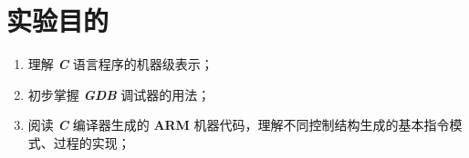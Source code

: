 \section{实验目的}
    \begin{enumerate}
        \item 理解 \textbf{\textit{C}} 语言程序的机器级表示；
        \item 初步掌握 \textbf{\textit{GDB}} 调试器的用法；
        \item 阅读 \textbf{\textit{C}} 编译器生成的 \textbf{ARM} 机器代码，理解不同控制结构生成的基本指令模式、过程的实现；
    \end{enumerate}